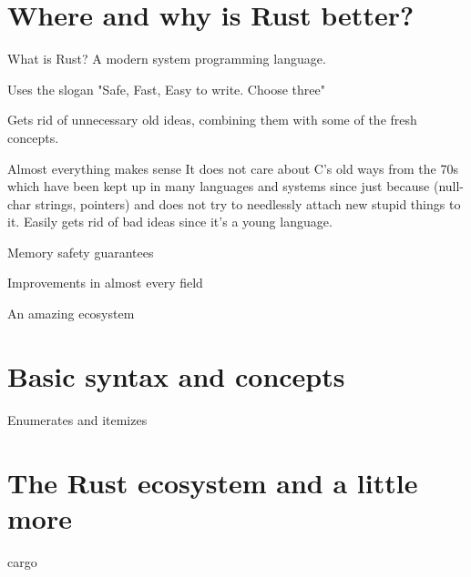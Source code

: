 \documentclass[usenames,dvipsnames,10pt,aspectratio=169]{beamer}
\begin{document}

\section{Where and why is Rust better?}

\begin{frame}{What is Rust?} 
A modern system programming language.

Uses the slogan "Safe, Fast, Easy to write. Choose three"

Gets rid of unnecessary old ideas, combining them
with some of the fresh concepts.
\end{frame}

\begin{frame}{Almost everything makes sense} 
It does not care about C’s old ways 
from the 70s which have been kept up 
in many languages and systems since 
just because (null-char strings, pointers) 
and does not try to needlessly attach new 
stupid things to it. Easily gets rid of bad 
ideas since it’s a young language.
\end{frame}

\begin{frame}{Memory safety guarantees} 
\end{frame}

\begin{frame}{Improvements in almost every field} 
\end{frame}

\begin{frame}{An amazing ecosystem} 
\end{frame}


\section{Basic syntax and concepts}

\begin{frame}{Enumerates and itemizes}

\end{frame}


\section{The Rust ecosystem and a little more}

\begin{frame}{cargo}
\end{frame}
\end{document}
